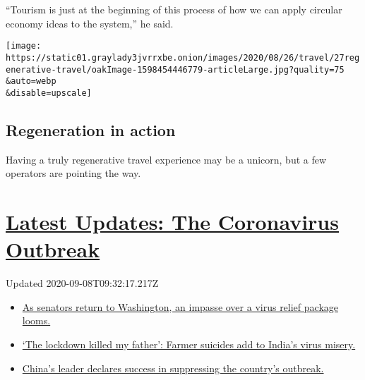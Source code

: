 ``Tourism is just at the beginning of this process of how we can apply
circular economy ideas to the system,'' he said.

\texttt{[image: https://static01.graylady3jvrrxbe.onion/images/2020/08/26/travel/27regenerative-travel/oakImage-1598454446779-articleLarge.jpg?quality=75\\\&auto=webp\\\&disable=upscale]}

\hypertarget{regeneration-in-action}{%
\subsection{Regeneration in action}\label{regeneration-in-action}}

Having a truly regenerative travel experience may be a unicorn, but a
few operators are pointing the way.

\hypertarget{latest-updates-the-coronavirus-outbreak}{%
\section{\texorpdfstring{\href{https://www.nytimes3xbfgragh.onion/2020/09/08/world/covid-19-coronavirus.html?action=click\&pgtype=Article\&state=default\&region=MAIN_CONTENT_1\&context=storylines_live_updates}{Latest
Updates: The Coronavirus
Outbreak}}{Latest Updates: The Coronavirus Outbreak}}\label{latest-updates-the-coronavirus-outbreak}}

Updated 2020-09-08T09:32:17.217Z

\begin{itemize}
\tightlist
\item
  \href{https://www.nytimes3xbfgragh.onion/2020/09/08/world/covid-19-coronavirus.html?action=click\&pgtype=Article\&state=default\&region=MAIN_CONTENT_1\&context=storylines_live_updates\#link-4a77847f}{As
  senators return to Washington, an impasse over a virus relief package
  looms.}
\item
  \href{https://www.nytimes3xbfgragh.onion/2020/09/08/world/covid-19-coronavirus.html?action=click\&pgtype=Article\&state=default\&region=MAIN_CONTENT_1\&context=storylines_live_updates\#link-1c973131}{`The
  lockdown killed my father': Farmer suicides add to India's virus
  misery.}
\item
  \href{https://www.nytimes3xbfgragh.onion/2020/09/08/world/covid-19-coronavirus.html?action=click\&pgtype=Article\&state=default\&region=MAIN_CONTENT_1\&context=storylines_live_updates\#link-adc17f7}{China's
  leader declares success in suppressing the country's outbreak.}
\end{itemize}

